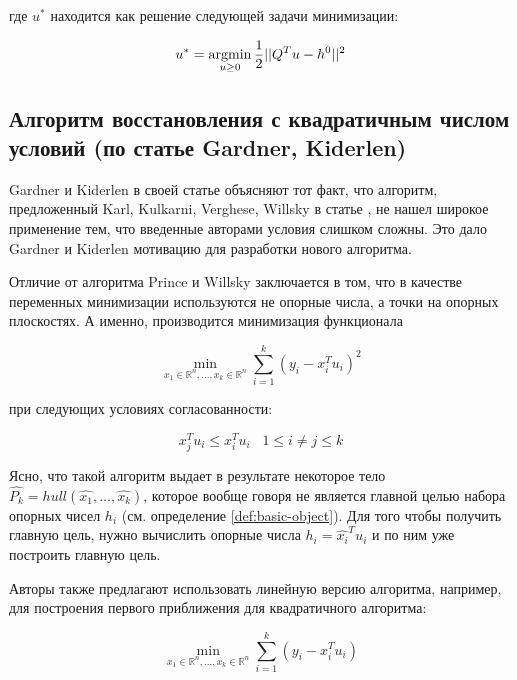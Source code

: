 \documentclass[a4paper, 12pt, titlepage]{article}
\theoremstyle{definition}
\theoremstyle{plain}
\theoremstyle{plain}
\begin{document}
где $u^{*}$ находится как решение следующей задачи минимизации:

\begin{equation}
 u^{*} = \operatornamewithlimits{argmin}_{u \geq 0}
 \frac{1}{2} ||Q^{T} u - h^{0}||^{2}
\end{equation}




\newpage
\subsection{Алгоритм восстановления с квадратичным числом условий (по статье
Gardner, Kiderlen)}

Gardner и Kiderlen в своей статье \cite{journals/pami/GardnerK09} объясняют
тот факт, что алгоритм, предложенный Karl, Kulkarni, Verghese, Willsky в статье 
\cite{journals/jmiv/KarlKVW96}, не нашел широкое применение тем, что
введенные авторами условия слишком сложны. Это дало Gardner и Kiderlen 
мотивацию для разработки нового алгоритма.

Отличие от алгоритма Prince и Willsky заключается в том, что в качестве 
переменных минимизации используются не опорные числа, а точки на опорных 
плоскостях. А именно, производится минимизация функционала

\begin{equation}
 \min_{x_{1} \in \mathbb{R}^{n}, \ldots, x_{k} \in \mathbb{R}^{n}}
 \sum \limits_{i = 1}^{k} (y_{i} - x_{i}^{T} u_{i})^{2}
\end{equation}

при следующих условиях согласованности:

\begin{equation}
 x_{j}^{T} u_{i} \leq x_{i}^{T} u_{i} \;\;\; 1 \leq i \neq j \leq k
\end{equation}

Ясно, что такой алгоритм выдает в результате некоторое тело
$\widehat{P_{k}} = hull(\widehat{x_{1}}, \ldots, \widehat{x_{k}})$, которое
вообще говоря не является главной целью набора опорных чисел $h_{i}$ (см. 
определение \ref{def:basic-object}). Для того чтобы получить главную цель, 
нужно вычислить опорные числа $h_{i} = \widehat{x_{i}}^{T} u_{i}$ и по ним уже 
построить главную цель.

Авторы также предлагают использовать линейную версию алгоритма, например, для
построения первого приближения для квадратичного алгоритма:

\begin{equation}
 \min_{x_{1} \in \mathbb{R}^{n}, \ldots, x_{k} \in \mathbb{R}^{n}}
 \sum \limits_{i = 1}^{k} (y_{i} - x_{i}^{T} u_{i})
\end{equation}
\end{document}
